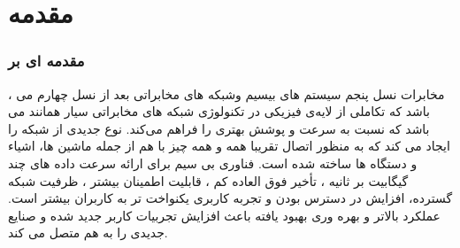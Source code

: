 \chapter{مقدمه}
\subsection{مقدمه ای بر  }
،
مخابرات نسل پنجم
سیستم های بیسیم  وشبکه های مخابراتی بعد از نسل چهارم می باشد که تکاملی از لایه‌ی فیزیکی در تکنولوژی شبکه های مخابراتی سیار همانند  می باشد که نسبت به  سرعت و پوشش بهتری را فراهم می‌کند.  
نوع جدیدی از شبکه را ایجاد می کند که به منظور اتصال تقریبا همه و همه چیز با هم از جمله ماشین ها، اشیاء و دستگاه ها ساخته شده است.
 فناوری بی سیم برای ارائه سرعت داده های چند گیگابیت بر ثانیه ، تأخیر فوق العاده کم ، قابلیت اطمینان بیشتر ، ظرفیت شبکه گسترده، افزایش در دسترس بودن و تجربه کاربری یکنواخت تر به کاربران بیشتر است. عملکرد بالاتر و بهره وری بهبود یافته باعث افزایش تجربیات کاربر جدید شده و صنایع جدیدی را به هم متصل می کند.
 
